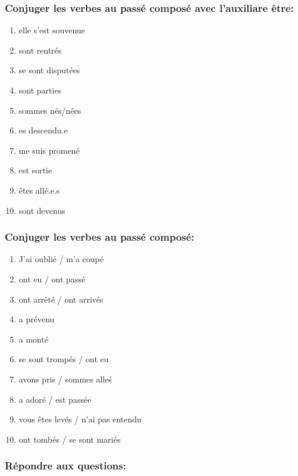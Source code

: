 \documentclass{article}
\begin{document}
\vspace*{1.5 cm}

\subsubsection*{Conjuger les verbes au passé composé avec l'auxiliare être:}

\begin{enumerate}
    \item elle s'est souvenue
    \item sont rentrés
    \item se sont disputées
    \item sont parties
    \item sommes nés/nées
    \item es descendu.e
    \item me suis promené
    \item est sortie
    \item êtes allé.e.s
    \item sont devenus
\end{enumerate}

\subsubsection*{Conjuger les verbes au passé composé:}

\begin{enumerate}
    \item J'ai oublié / m'a coupé
    \item ont eu / ont passé
    \item ont arrêté / ont arrivés
    \item a prévenu
    \item a monté
    \item se sont trompés / ont eu
    \item avons pris / sommes alleś
    \item a adoré / est passée
    \item vous êtes levés / n'ai pas entendu
    \item ont tombés / se sont mariés
\end{enumerate}

\subsubsection*{Répondre aux questions:}
\end{document}
